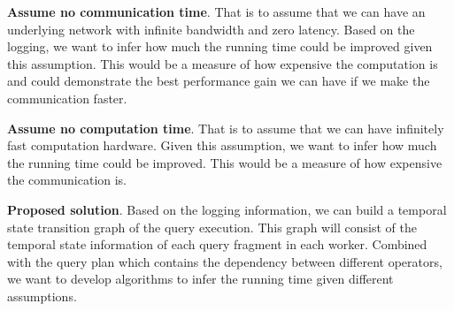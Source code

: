 \documentclass[11pt]{scrartcl}
\begin{document}
\noindent\textbf{Assume no communication time}.  That is to assume that we can have an underlying network with infinite bandwidth and zero latency. Based on the logging, we want to infer how much the running time could be improved given this assumption. This would be a measure of how expensive the computation is and could demonstrate the best performance gain we can have if we make the communication faster.

\noindent\textbf{Assume no computation time}.  That is to assume that we can have infinitely fast computation hardware. Given this assumption, we want to infer how much the running time could be improved. This would be a measure of how expensive the communication is.

\noindent\textbf{Proposed solution}.  Based on the logging information, we can build a temporal state transition graph of the query execution. This graph will consist of the temporal state information of each query fragment in each worker. Combined with the query plan which contains the dependency between different operators, we want to develop algorithms to infer the running time given different assumptions.



\end{document}
